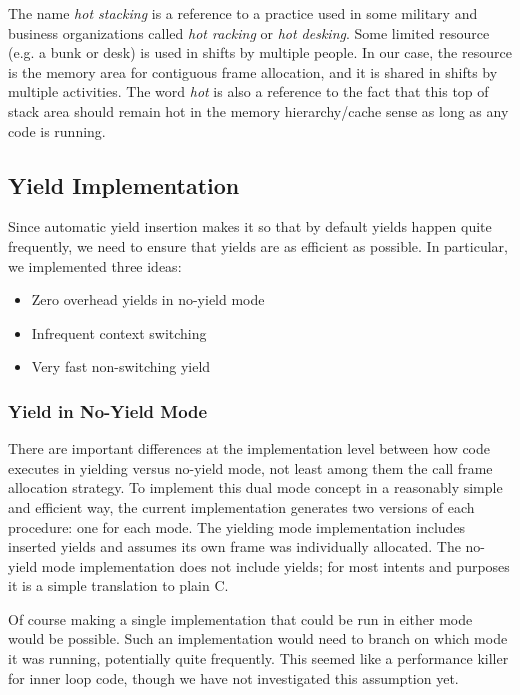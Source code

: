 \documentclass[9pt,preprint]{sigplanconf}
\begin{document}
The name \emph{hot stacking} is a reference to a practice used in some military and business organizations called \emph{hot racking} or \emph{hot desking}.
Some limited resource (e.g. a bunk or desk) is used in shifts by multiple people.
In our case, the resource is the memory area for contiguous frame allocation, and it is shared in shifts by multiple activities.
The word \emph{hot} is also a reference to the fact that this top of stack area should remain hot in the memory hierarchy/cache sense as long as any code is running.

\subsection{Yield Implementation}
\label{sec:yield_imp}

Since automatic yield insertion makes it so that by default yields happen quite frequently, we need to ensure that yields are as efficient as possible.
In particular, we implemented three ideas:

\begin{itemize}
\item Zero overhead yields in no-yield mode
\item Infrequent context switching
\item Very fast non-switching yield
\end{itemize}

\subsubsection{Yield in No-Yield Mode}

There are important differences at the implementation level between how code executes in yielding versus no-yield mode, not least among them the call frame allocation strategy.
To implement this dual mode concept in a reasonably simple and efficient way, the current \charcoal{} implementation generates two versions of each procedure: one for each mode.
The yielding mode implementation includes inserted yields and assumes its own frame was individually allocated.
The no-yield mode implementation does not include yields; for most intents and purposes it is a simple translation to plain C.

Of course making a single implementation that could be run in either mode would be possible.
Such an implementation would need to branch on which mode it was running, potentially quite frequently.
This seemed like a performance killer for inner loop code, though we have not investigated this assumption yet.
\end{document}

